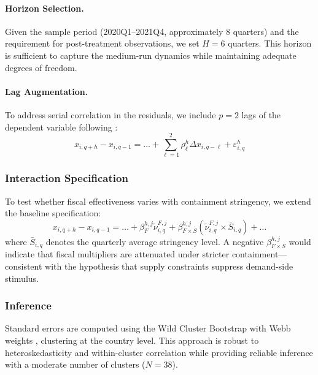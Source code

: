 \documentclass[12pt, a4paper]{article}
\begin{document}
\paragraph{Horizon Selection.} Given the sample period (2020Q1--2021Q4, approximately 8 quarters) and the requirement for post-treatment observations, we set $H = 6$ quarters. This horizon is sufficient to capture the medium-run dynamics while maintaining adequate degrees of freedom.

\paragraph{Lag Augmentation.} To address serial correlation in the residuals, we include $p = 2$ lags of the dependent variable following \citet{jorda2025local}:
\begin{equation}
    x_{i,q+h} - x_{i,q-1} = \ldots + \sum_{\ell=1}^{2} \rho^h_\ell \Delta x_{i,q-\ell} + \varepsilon^h_{i,q}
\end{equation}

\subsubsection{Interaction Specification}

To test whether fiscal effectiveness varies with containment stringency, we extend the baseline specification:
\begin{equation}
    x_{i,q+h} - x_{i,q-1} = \ldots + \beta^{h,j}_F \tilde{\nu}^{F,j}_{i,q} + \beta^{h,j}_{F \times S} \left( \tilde{\nu}^{F,j}_{i,q} \times \bar{S}_{i,q} \right) + \ldots
    \label{eq:LP_interaction}
\end{equation}
where $\bar{S}_{i,q}$ denotes the quarterly average stringency level. A negative $\beta^{h,j}_{F \times S}$ would indicate that fiscal multipliers are attenuated under stricter containment—consistent with the hypothesis that supply constraints suppress demand-side stimulus.

\subsubsection{Inference}

Standard errors are computed using the Wild Cluster Bootstrap with Webb weights \citep{webb2023wild}, clustering at the country level. This approach is robust to heteroskedasticity and within-cluster correlation while providing reliable inference with a moderate number of clusters ($N = 38$).
\end{document}
